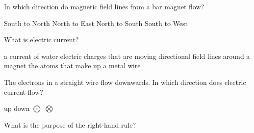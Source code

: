 \documentclass{exam}
\begin{document}
\begin{questions}

\question
In which direction do magnetic field lines from a bar magnet flow?

\begin{randomizechoices}
\choice South to North
\choice North to East
\CorrectChoice North to South
\choice South to West
\end{randomizechoices}

\question
What is electric current?

\begin{randomizechoices}
\choice a current of water
\CorrectChoice electric charges that are moving
\choice directional field lines around a magnet
\choice the atoms that make up a metal wire
\end{randomizechoices}



\question
The electrons in a straight wire flow downwards. In which direction does electric current flow?

\begin{randomizechoices}
\CorrectChoice up
\choice down
\choice $\bigodot$
\choice $\bigotimes$
\end{randomizechoices}


\clearpage

\question
What is the purpose of the right-hand rule?


\end{questions}
\end{document}
